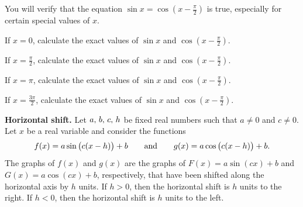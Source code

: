 \documentclass[a4paper,oneside,12pt]{article}
\begin{document}
\begin{exercise}
You will verify that the equation $\sin x = \cos(x - \frac{\pi}{2})$
is true, especially for certain special values of $x$.
\begin{packedenum}
\item\label{subex:trigonometric:cos_right_shift_0}
  If $x = 0$, calculate the exact values of $\sin x$ and
  $\cos(x - \frac{\pi}{2})$.

\item\label{subex:trigonometric:cos_right_shift_pi_half}
  If $x = \frac{\pi}{2}$, calculate the exact values of $\sin x$ and
  $\cos(x - \frac{\pi}{2})$.

\item\label{subex:trigonometric:cos_right_shift_pi}
  If $x = \pi$, calculate the exact values of $\sin x$ and
  $\cos(x - \frac{\pi}{2})$.

\item\label{subex:trigonometric:cos_right_shift_3pi_half}
  If $x = \frac{3\pi}{2}$, calculate the exact values of $\sin x$ and
  $\cos(x - \frac{\pi}{2})$.
\end{packedenum}
\end{exercise}


\begin{definition}
\label{def:trigonometric:horizontal_shift}
\textbf{Horizontal shift.}
Let ${a},\, {b},\, {c},\, {h}$ be fixed real numbers such that
$a \neq 0$ and $c \neq 0$.  Let $x$ be a real variable and consider
the functions
\[
f(x)
=
a \sin\big(c (x - h)\big) + b
\qquad
\text{and}
\qquad
g(x)
=
a \cos\big(c (x - h)\big) + b.
\]
The graphs of $f(x)$ and $g(x)$ are the graphs of
$F(x) = a \sin(cx) + b$ and $G(x) = a \cos(cx) + b$, respectively,
that have been shifted along the horizontal axis by $h$ units.  If
$h > 0$, then the horizontal shift is $h$ units to the right.  If
$h < 0$, then the horizontal shift is $h$ units to the left.
\end{definition}
\end{document}
